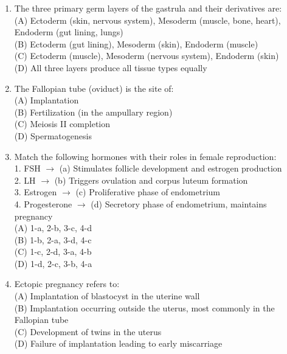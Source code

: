 \documentclass{article}
\begin{document}
\begin{enumerate}[label=Q\arabic*.]
\item The three primary germ layers of the gastrula and their derivatives are:
\\(A) Ectoderm (skin, nervous system), Mesoderm (muscle, bone, heart), Endoderm (gut lining, lungs)
\\(B) Ectoderm (gut lining), Mesoderm (skin), Endoderm (muscle)
\\(C) Ectoderm (muscle), Mesoderm (nervous system), Endoderm (skin)
\\(D) All three layers produce all tissue types equally

\item The Fallopian tube (oviduct) is the site of:
\\(A) Implantation
\\(B) Fertilization (in the ampullary region)
\\(C) Meiosis II completion
\\(D) Spermatogenesis

\item Match the following hormones with their roles in female reproduction:\\
1. FSH $\rightarrow$ (a) Stimulates follicle development and estrogen production\\
2. LH $\rightarrow$ (b) Triggers ovulation and corpus luteum formation\\
3. Estrogen $\rightarrow$ (c) Proliferative phase of endometrium\\
4. Progesterone $\rightarrow$ (d) Secretory phase of endometrium, maintains pregnancy
\\(A) 1-a, 2-b, 3-c, 4-d
\\(B) 1-b, 2-a, 3-d, 4-c
\\(C) 1-c, 2-d, 3-a, 4-b
\\(D) 1-d, 2-c, 3-b, 4-a

\item Ectopic pregnancy refers to:
\\(A) Implantation of blastocyst in the uterine wall
\\(B) Implantation occurring outside the uterus, most commonly in the Fallopian tube
\\(C) Development of twins in the uterus
\\(D) Failure of implantation leading to early miscarriage

\end{enumerate}
\end{document}
